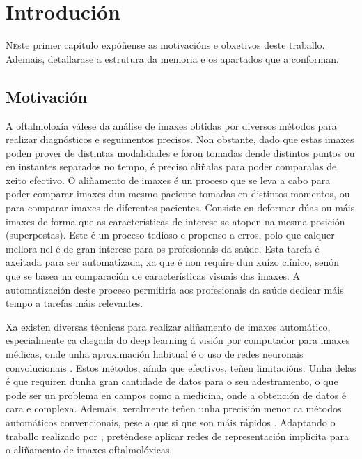 \chapter{Introdución}
\label{chap:introducion}

\lettrine{N} este primer capítulo expóñense as motivacións e obxetivos deste traballo. Ademais, detallarase a estrutura da memoria e os apartados que a conforman.

\section{Motivación}
\label{sec:motivacion}

A oftalmoloxía válese da análise de imaxes obtidas por diversos métodos para realizar diagnósticos e seguimentos precisos.
Non obstante, dado que estas imaxes poden prover de distintas modalidades e foron tomadas dende distintos puntos ou en instantes separados no tempo, é preciso aliñalas para poder comparalas de xeito efectivo.
O aliñamento de imaxes é un proceso que se leva a cabo para poder comparar imaxes dun mesmo paciente tomadas en distintos momentos, ou para comparar imaxes de diferentes pacientes.
Consiste en deformar dúas ou máis imaxes de forma que as características de interese se atopen na mesma posición (superpostas).
Este é un proceso tedioso e propenso a erros, polo que calquer mellora nel é de gran interese para os profesionais da saúde. 
Esta tarefa é axeitada para ser automatizada, xa que é non require dun xuízo clínico, senón que se basea na comparación de características visuais das imaxes. A automatización deste proceso permitiría aos profesionais da saúde dedicar máis tempo a tarefas máis relevantes.

Xa existen diversas técnicas para realizar aliñamento de imaxes automático, especialmente ca chegada do deep learning á visión por computador para imaxes médicas, onde unha aproximación habitual é o uso de redes neuronais convolucionais \cite{medicalimageanalysis}.
Estos métodos, aínda que efectivos, teñen limitacións. Unha delas é que requiren dunha gran cantidade de datos para o seu adestramento, o que pode ser un problema en campos como a medicina, onde a obtención de datos é cara e complexa. Ademais, xeralmente teñen unha precisión menor ca métodos automáticos convencionais, pese a que si que son máis rápidos \cite{bharati2022deeplearningmedicalimage}.
Adaptando o traballo realizado por \cite{wolterink2021implicit}, preténdese aplicar redes de representación implícita para o aliñamento de imaxes oftalmolóxicas.

